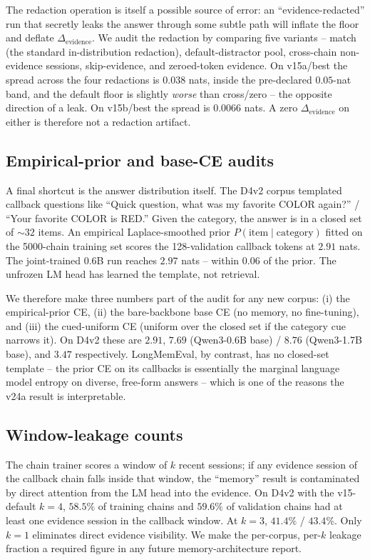 \documentclass[11pt]{article}
\newcommand{\elift}{\Delta_{\mathrm{evidence}}}
\begin{document}
The redaction operation is itself a possible source of error: an
``evidence-redacted'' run that secretly leaks the answer through some
subtle path will inflate the floor and deflate $\elift$. We audit
the redaction by comparing five variants -- match (the standard
in-distribution redaction), default-distractor pool, cross-chain
non-evidence sessions, skip-evidence, and zeroed-token evidence.
On v15a/best the spread across the four redactions is $0.038$ nats,
inside the pre-declared $0.05$-nat band, and the default floor is
slightly \emph{worse} than cross/zero -- the opposite direction of a
leak. On v15b/best the spread is $0.0066$ nats. A zero $\elift$ on
either is therefore not a redaction artifact.

\subsection{Empirical-prior and base-CE audits}

A final shortcut is the answer distribution itself. The D4v2 corpus
templated callback questions like ``Quick question, what was my
favorite COLOR again?'' / ``Your favorite COLOR is RED.'' Given the
category, the answer is in a closed set of $\sim 32$ items. An
empirical Laplace-smoothed prior $P(\mathrm{item} \mid \mathrm{category})$
fitted on the 5000-chain training set scores the 128-validation
callback tokens at $2.91$ nats. The joint-trained 0.6B run reaches
$2.97$ nats -- within $0.06$ of the prior. The unfrozen LM head has
learned the template, not retrieval.

We therefore make three numbers part of the audit for any new corpus:
(i) the empirical-prior CE, (ii) the bare-backbone base CE (no
memory, no fine-tuning), and (iii) the cued-uniform CE (uniform over
the closed set if the category cue narrows it). On D4v2 these are
$2.91$, $7.69$ (Qwen3-0.6B base) / $8.76$ (Qwen3-1.7B base), and
$3.47$ respectively. LongMemEval, by contrast, has no closed-set
template -- the prior CE on its callbacks is essentially the marginal
language model entropy on diverse, free-form answers -- which is one
of the reasons the v24a result is interpretable.

\subsection{Window-leakage counts}

The chain trainer scores a window of $k$ recent sessions; if any
evidence session of the callback chain falls inside that window, the
``memory'' result is contaminated by direct attention from the LM head
into the evidence. On D4v2 with the v15-default $k=4$, $58.5\%$ of
training chains and $59.6\%$ of validation chains had at least one
evidence session in the callback window. At $k=3$, $41.4\%$ /
$43.4\%$. Only $k=1$ eliminates direct evidence visibility. We make
the per-corpus, per-$k$ leakage fraction a required figure in any
future memory-architecture report.
\end{document}
